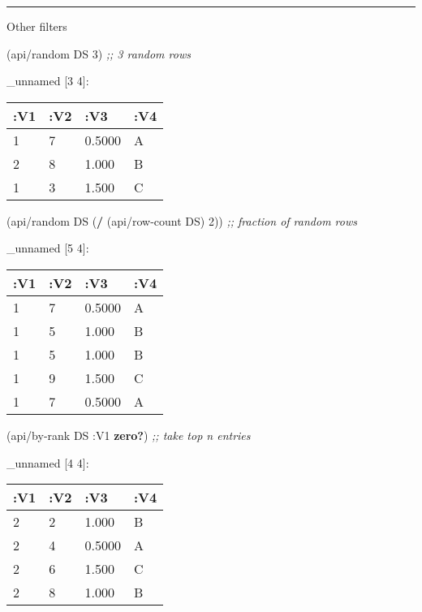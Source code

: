 \documentclass[]{article}
\newenvironment{Shaded}{\begin{snugshade}}{\end{snugshade}}
\newcommand{\KeywordTok}[1]{\textcolor[rgb]{0.13,0.29,0.53}{\textbf{#1}}}
\newcommand{\DecValTok}[1]{\textcolor[rgb]{0.00,0.00,0.81}{#1}}
\newcommand{\CommentTok}[1]{\textcolor[rgb]{0.56,0.35,0.01}{\textit{#1}}}
\newcommand{\AttributeTok}[1]{\textcolor[rgb]{0.77,0.63,0.00}{#1}}
\newcommand{\NormalTok}[1]{#1}
\begin{document}
\begin{center}\rule{0.5\linewidth}{0.5pt}\end{center}

Other filters

\begin{Shaded}
\begin{Highlighting}[]
\NormalTok{(api/random DS }\DecValTok{3}\NormalTok{) }\CommentTok{;; 3 random rows}
\end{Highlighting}
\end{Shaded}

\_unnamed {[}3 4{]}:

\begin{longtable}[]{@{}llll@{}}
\toprule
:V1 & :V2 & :V3 & :V4\tabularnewline
\midrule
\endhead
1 & 7 & 0.5000 & A\tabularnewline
2 & 8 & 1.000 & B\tabularnewline
1 & 3 & 1.500 & C\tabularnewline
\bottomrule
\end{longtable}

\begin{Shaded}
\begin{Highlighting}[]
\NormalTok{(api/random DS (}\KeywordTok{/}\NormalTok{ (api/row-count DS) }\DecValTok{2}\NormalTok{)) }\CommentTok{;; fraction of random rows}
\end{Highlighting}
\end{Shaded}

\_unnamed {[}5 4{]}:

\begin{longtable}[]{@{}llll@{}}
\toprule
:V1 & :V2 & :V3 & :V4\tabularnewline
\midrule
\endhead
1 & 7 & 0.5000 & A\tabularnewline
1 & 5 & 1.000 & B\tabularnewline
1 & 5 & 1.000 & B\tabularnewline
1 & 9 & 1.500 & C\tabularnewline
1 & 7 & 0.5000 & A\tabularnewline
\bottomrule
\end{longtable}

\begin{Shaded}
\begin{Highlighting}[]
\NormalTok{(api/by-rank DS }\AttributeTok{:V1} \KeywordTok{zero?}\NormalTok{) }\CommentTok{;; take top n entries}
\end{Highlighting}
\end{Shaded}

\_unnamed {[}4 4{]}:

\begin{longtable}[]{@{}llll@{}}
\toprule
:V1 & :V2 & :V3 & :V4\tabularnewline
\midrule
\endhead
2 & 2 & 1.000 & B\tabularnewline
2 & 4 & 0.5000 & A\tabularnewline
2 & 6 & 1.500 & C\tabularnewline
2 & 8 & 1.000 & B\tabularnewline
\bottomrule
\end{longtable}
\end{document}
